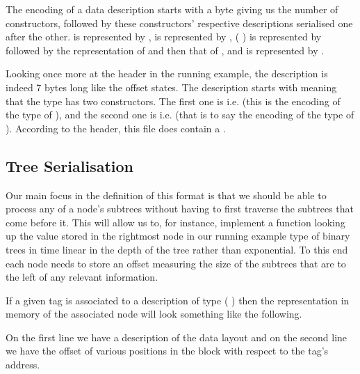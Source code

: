 The encoding of a data description starts with a byte giving us the number
of constructors, followed by these constructors' respective descriptions
serialised one after the other.
%
 is represented by ,
 is represented by ,
(  ) is represented by
 followed by the representation of  and then that of ,
and  is represented by .


Looking once more at the header in the running example,
the  description is indeed 7 bytes long like the offset states.
The  description starts with 
meaning that the type has two constructors.
The first one is  i.e. 
(this is the encoding of the type of ),
and the second one is  i.e.
\IdrisKeyword{(} 
\IdrisKeyword{(}  \IdrisKeyword{))}
(that is to say the encoding of the type of ).
%
According to the header, this file does contain a .

\subsection{Tree Serialisation}\label{sec:tree-serialisation}

Our main focus in the definition of this format is that we should be able
to process any of a node's subtrees without having to first traverse the
subtrees that come before it.
%
This will allow us to, for instance, implement a function looking up the
value stored in the rightmost node in our running example type of binary
trees in time linear in the depth of the tree rather than exponential.
%
To this end each node needs to store an offset measuring the size of the
subtrees that are to the left of any relevant information.

If a given tag is associated to a description of type
(   )
then the representation in memory of the associated node will look something
like the following.

\label{fig:data-layout}
\begin{center}

\end{center}

On the first line we have a description of the data layout and on the
second line we have the offset of various positions in the block with
respect to the tag's address.

